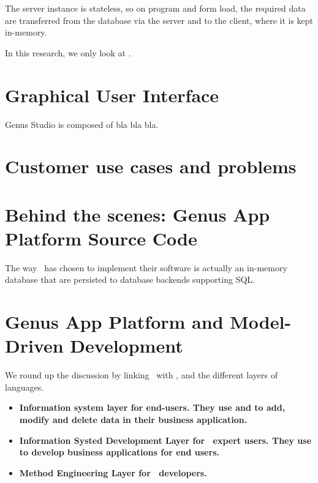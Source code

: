 The server instance is stateless, so on program and form load, the required data are transferred from the database via the server and to the client, where it is kept in-memory.

In this research, we only look at .

\section{Graphical User Interface}
\label{sec:Graphical User Interface}
Genus Studio is composed of bla bla bla.

\section{Customer use cases and problems}
\label{sec:Customer use cases and problems}

\section{Behind the scenes: Genus App Platform Source Code}
\label{sec:Original Implementation}

The way \genus~has chosen to implement their software is actually an in-memory database that are persisted to database backends supporting SQL. 

\section{Genus App Platform and Model-Driven Development}
\label{sec:Genus App Platform and Model-Driven Development}
We round up the discussion by linking \gap~with \mdd, and the different layers of languages.

\begin{itemize}
    \item \bf{Information system layer} for end-users. They use  and  to add, modify and delete data in their business application.
    \item \bf{Information Systed Development Layer} for \gap~expert users. They use  to develop business applications for end users.
    \item \bf{Method Engineering Layer} for \gap~developers. 
\end{itemize}

